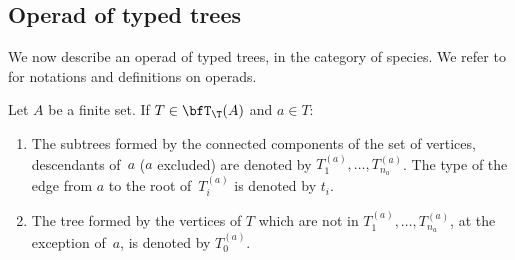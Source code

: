 \subsection{Operad of typed trees}

We now describe an operad of typed trees, in the category of species.
We refer to \cite{Dotsenko,Vallette,Markl} for notations and definitions on operads.

\begin{Notation} Let $A$ be a finite set. If $T\in \bfT_\T(A)$ and $a\in T$:
\begin{enumerate}\itemsep=0pt
\item The subtrees formed by the connected components of the set of vertices, descendants of~$a$ ($a$ excluded)
are denoted by $T_1^{(a)},\dots,T_{n_a}^{(a)}$.
The type of the edge from $a$ to the root of~$T_i^{(a)}$ is denoted by $t_i$.
\item The tree formed by the vertices of $T$ which are not in $T_1^{(a)},\dots,T_{n_a}^{(a)}$,
at the exception of~$a$, is denoted by $T_0^{(a)}$.
\end{enumerate}
\end{Notation}

